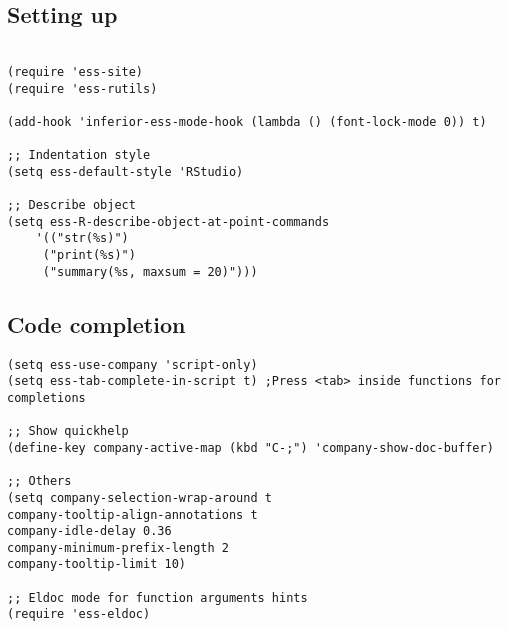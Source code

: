 \documentclass[11pt]{article}
\begin{document}
\subsection{Setting up}
\label{sec:org15548c5}
\begin{verbatim}

(require 'ess-site)
(require 'ess-rutils)

(add-hook 'inferior-ess-mode-hook (lambda () (font-lock-mode 0)) t)

;; Indentation style
(setq ess-default-style 'RStudio)

;; Describe object
(setq ess-R-describe-object-at-point-commands
    '(("str(%s)")
     ("print(%s)")
     ("summary(%s, maxsum = 20)")))

\end{verbatim}

\subsection{Code completion}
\label{sec:org5f9a376}
\begin{verbatim}
(setq ess-use-company 'script-only)
(setq ess-tab-complete-in-script t)	;Press <tab> inside functions for completions

;; Show quickhelp
(define-key company-active-map (kbd "C-;") 'company-show-doc-buffer)

;; Others
(setq company-selection-wrap-around t
company-tooltip-align-annotations t
company-idle-delay 0.36
company-minimum-prefix-length 2
company-tooltip-limit 10)

;; Eldoc mode for function arguments hints
(require 'ess-eldoc)

\end{verbatim}
\end{document}

